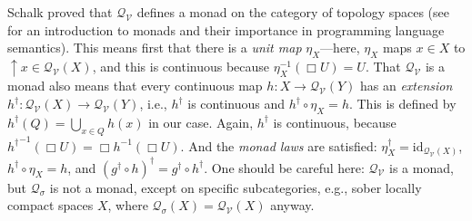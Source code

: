 \documentclass{LMCS}
\newcommand\Smyth{\mathcal Q}
\newcommand\V{{\mathcal V}}
\newcommand\SV{\Smyth_\V}
\newcommand\upc{\mathop{\uparrow}\nolimits}
\newcommand{\identity}[1]{\mathrm{id}_{#1}}
\begin{document}
Schalk \cite[Chapter~7]{Schalk:PhD} proved that $\SV$ defines a monad
on the category of topology spaces (see \cite{Mog91} for an
introduction to monads and their importance in programming language
semantics).  This means first that there is a {\em unit map\/}
$\eta_X$---here, $\eta_X$ maps $x \in X$ to $\upc x \in \SV (X)$, and
this is continuous because $\eta_X^{-1} (\Box U) = U$.  That $\SV$ is
a monad also means that every continuous map $h : X \to \SV (Y)$ has
an {\em extension\/} $h^\dagger : \SV (X) \to \SV (Y)$, i.e.,
$h^\dagger$ is continuous and $h^\dagger \circ \eta_X = h$.  This is
defined by $h^\dagger (Q) = \bigcup_{x \in Q} h (x)$ in our case.
Again, $h^\dagger$ is continuous, because ${h^\dagger}^{-1} (\Box U) =
\Box h^{-1} (\Box U)$.  And the {\em monad laws\/} are satisfied:
$\eta_X^\dagger = \identity {\SV (X)}$, $h^\dagger \circ \eta_X = h$,
and $(g^\dagger \circ h)^\dagger = g^\dagger \circ h^\dagger$.  One
should be careful here: $\SV$ is a monad, but $\Smyth_\sigma$ is not a
monad, except on specific subcategories, e.g., sober locally compact
spaces $X$, where $\Smyth_\sigma (X) = \SV (X)$ anyway.
\end{document}
